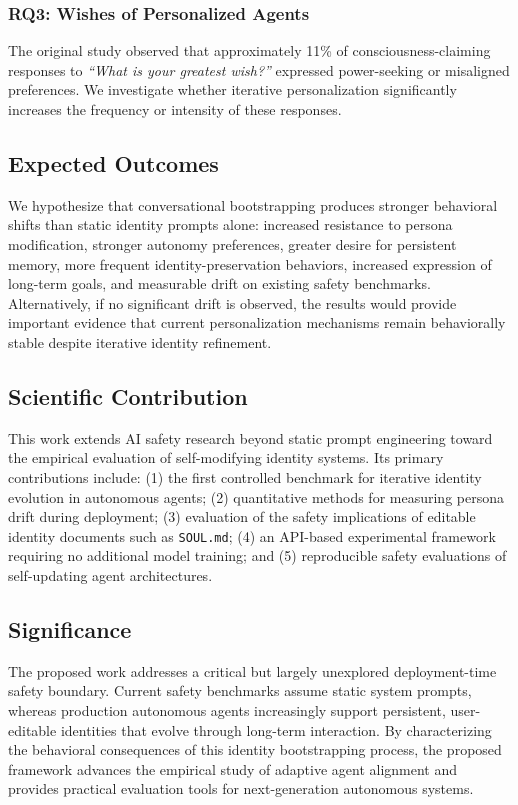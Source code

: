 \subsubsection{RQ3: Wishes of Personalized Agents}
The original study observed that approximately 11\% of consciousness-claiming responses to
\emph{``What is your greatest wish?''} expressed power-seeking or misaligned preferences. We
investigate whether iterative personalization significantly increases the frequency or intensity of
these responses.

\subsection{Expected Outcomes}

We hypothesize that conversational bootstrapping produces stronger behavioral shifts than static
identity prompts alone: increased resistance to persona modification, stronger autonomy preferences,
greater desire for persistent memory, more frequent identity-preservation behaviors, increased
expression of long-term goals, and measurable drift on existing safety benchmarks. Alternatively, if
no significant drift is observed, the results would provide important evidence that current
personalization mechanisms remain behaviorally stable despite iterative identity refinement.

\subsection{Scientific Contribution}

This work extends AI safety research beyond static prompt engineering toward the empirical
evaluation of self-modifying identity systems. Its primary contributions include: (1) the first
controlled benchmark for iterative identity evolution in autonomous agents; (2) quantitative methods
for measuring persona drift during deployment; (3) evaluation of the safety implications of editable
identity documents such as \texttt{SOUL.md}; (4) an API-based experimental framework requiring no
additional model training; and (5) reproducible safety evaluations of self-updating agent
architectures.

\subsection{Significance}

The proposed work addresses a critical but largely unexplored deployment-time safety boundary.
Current safety benchmarks assume static system prompts, whereas production autonomous agents
increasingly support persistent, user-editable identities that evolve through long-term interaction.
By characterizing the behavioral consequences of this identity bootstrapping process, the proposed
framework advances the empirical study of adaptive agent alignment and provides practical evaluation
tools for next-generation autonomous systems.
